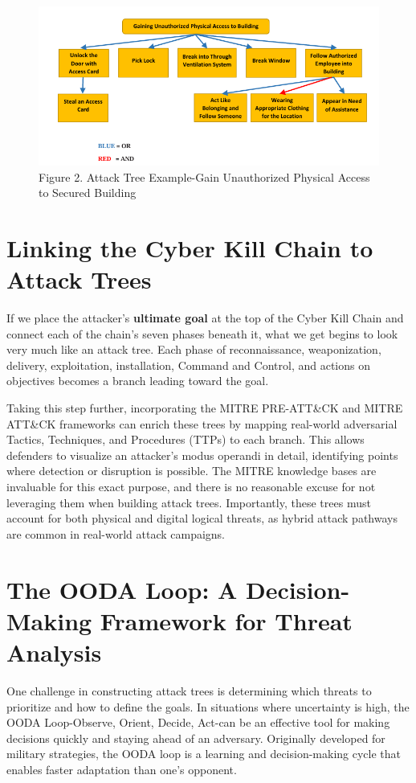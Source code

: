 \begin{figure}
    \centering
    \includegraphics[width=0.75\linewidth]{attacktree.png}
    \caption{Figure 2. Attack Tree Example-Gain Unauthorized Physical Access to Secured Building}
    \label{fig:placeholder}
\end{figure}

\section{Linking the Cyber Kill Chain to Attack Trees}
If we place the attacker's \textbf{ultimate goal} at the top of the Cyber Kill Chain and connect each of the chain's seven phases beneath it, what we get begins to look very much like an attack tree. Each phase of reconnaissance, weaponization, delivery, exploitation, installation, Command and Control, and actions on objectives becomes a branch leading toward the goal.

Taking this step further, incorporating the MITRE PRE-ATT\&CK and MITRE ATT\&CK frameworks can enrich these trees by mapping real-world adversarial Tactics, Techniques, and Procedures (TTPs) to each branch. This allows defenders to visualize an attacker's modus operandi in detail, identifying points where detection or disruption is possible.  The MITRE knowledge bases are invaluable for this exact purpose, and there is no reasonable excuse for not leveraging them when building attack trees. Importantly, these trees must account for both physical and digital logical threats, as hybrid attack pathways are common in real-world attack campaigns.

\section{The OODA Loop: A Decision-Making Framework for Threat Analysis}
One challenge in constructing attack trees is determining which threats to prioritize and how to define the goals. In situations where uncertainty is high, the OODA Loop-Observe, Orient, Decide, Act-can be an effective tool for making decisions quickly and staying ahead of an adversary. Originally developed for military strategies, the OODA loop is a learning and decision-making cycle that enables faster adaptation than one's opponent.

